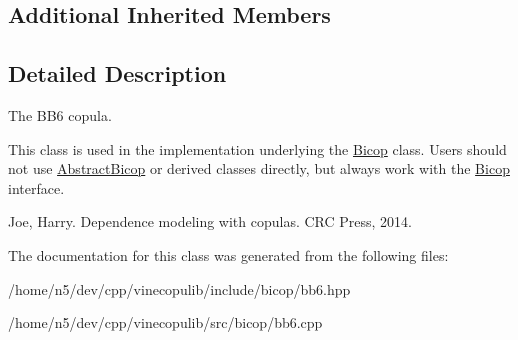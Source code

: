 \subsection*{Additional Inherited Members}


\subsection{Detailed Description}
The B\+B6 copula. 

This class is used in the implementation underlying the \hyperlink{classvinecopulib_1_1_bicop}{Bicop} class. Users should not use \hyperlink{classvinecopulib_1_1_abstract_bicop}{Abstract\+Bicop} or derived classes directly, but always work with the \hyperlink{classvinecopulib_1_1_bicop}{Bicop} interface.

Joe, Harry. Dependence modeling with copulas. C\+RC Press, 2014. 

The documentation for this class was generated from the following files\+:\begin{DoxyCompactItemize}
\item 
/home/n5/dev/cpp/vinecopulib/include/bicop/bb6.\+hpp\item 
/home/n5/dev/cpp/vinecopulib/src/bicop/bb6.\+cpp\end{DoxyCompactItemize}
